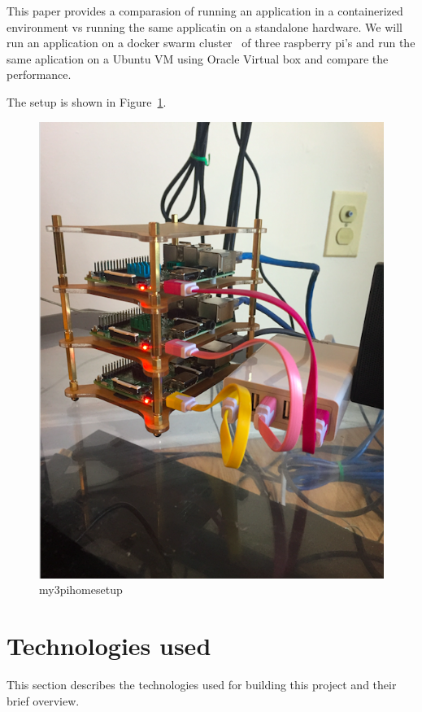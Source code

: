 This paper provides a comparasion of running an application in a
containerized environment vs running the same applicatin on a
standalone hardware. We will run an application on a docker swarm
cluster~\cite{hid-sp18-413-dockerswarm} of three raspberry pi's and
run the same aplication on a Ubuntu VM using Oracle Virtual box and
compare the performance.

The setup is shown in Figure~\ref{F:setup}.

\begin{figure}[!ht]
  \centering\includegraphics[width=\columnwidth]{images/hid-sp18-413-my3pi.png}
  \caption{my3pihomesetup}\label{F:setup}
\end{figure}

\section{Technologies used}
This section describes the technologies used for building this project
and their brief overview. 

